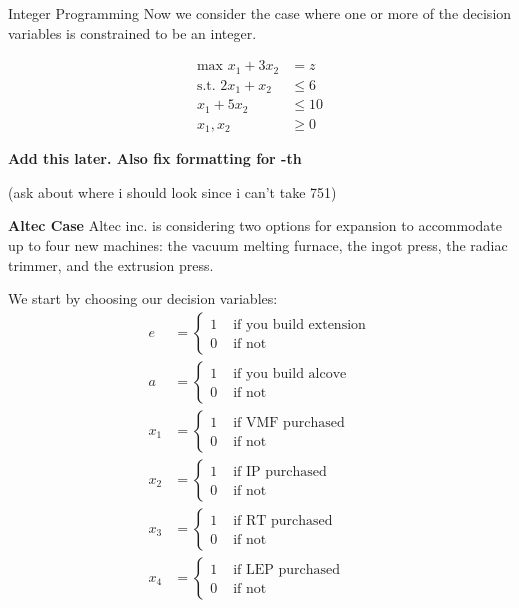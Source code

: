 \documentclass{article}
\begin{document}
\begin{section}{Integer Programming}
Now we consider the case where one or more of the decision variables is constrained to be an integer. 

\begin{eg}
    \begin{align*}
        \text{max }x_1+3x_2&=z \\
        \text{s.t. }2x_1+x_2&\leq 6 \\
        x_1+5x_2&\leq 10 \\
        x_1,x_2&\geq 0
    \end{align*}
\end{eg}
\begin{answer}
    \textbf{Add this later. Also fix formatting for -th}
\end{answer}

(ask about where i should look since i can't take 751)

\begin{eg}{\textbf{Altec Case}}
    Altec inc. is considering two options for expansion to accommodate up to four new machines: 
    the vacuum melting furnace, the ingot press, the radiac trimmer, and the extrusion press.
\end{eg}
\begin{answer}
    We start by choosing our decision variables: \\
    \begin{align*}
        e&=\begin{cases}
            1 & \text{ if you build extension} \\ 
            0 & \text{ if not} 
        \end{cases} \\
        a&=\begin{cases}
            1 & \text{ if you build alcove} \\
            0 & \text{ if not}
        \end{cases} \\
        x_1&=\begin{cases}
            1 & \text{ if VMF purchased} \\
            0 & \text{ if not}
        \end{cases}\\
        x_2&=\begin{cases}
            1 & \text{ if IP purchased} \\
            0 & \text{ if not}
        \end{cases}\\
        x_3&=\begin{cases}
            1 & \text{ if RT purchased} \\
            0 & \text{ if not}
        \end{cases}\\
        x_4&=\begin{cases}
            1 & \text{ if LEP purchased} \\
            0 & \text{ if not}
        \end{cases}\\
    \end{align*}


\end{answer}
\end{section}
\end{document}
